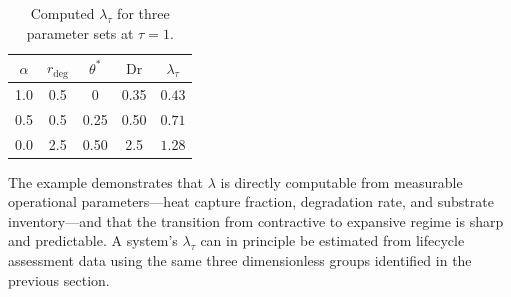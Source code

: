 \documentclass[10pt,twocolumn]{article}
\theoremstyle{plain}
\theoremstyle{definition}
\theoremstyle{remark}
\begin{document}
\begin{table}[t]
\centering
\caption{Computed $\lambda_\tau$ for three parameter sets at $\tau=1$.}
\label{tab:example}
\small
\begin{tabular}{ccccc}
\toprule
$\alpha$ & $r_{\mathrm{deg}}$ & $\theta^*$ & $\mathrm{Dr}$ & $\lambda_\tau$ \\
\midrule
1.0 & 0.5 & 0    & 0.35 & $0.43$ \\
0.5 & 0.5 & 0.25 & 0.50 & $0.71$ \\
0.0 & 2.5 & 0.50 & 2.5  & $1.28$ \\
\bottomrule
\end{tabular}
\end{table}

The example demonstrates that $\lambda$ is directly computable from
measurable operational parameters---heat capture fraction, degradation
rate, and substrate inventory---and that the transition from contractive
to expansive regime is sharp and predictable. A system's $\lambda_\tau$
can in principle be estimated from lifecycle assessment data using the
same three dimensionless groups identified in the previous section.
\end{document}
